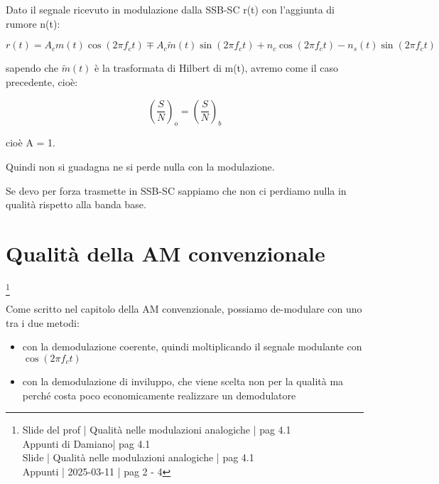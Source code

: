 Dato il segnale ricevuto in modulazione dalla SSB-SC r(t) con l'aggiunta di rumore n(t): 

{
    \Large 
    \begin{equation}
        r (t)
        =
        A_c m(t) \cos(2 \pi f_c t)
        \mp
        A_c \tilde{m} (t) \sin(2 \pi f_c t)
        +
        n_c \cos(2 \pi f_c t)
        - 
        n_s (t) \sin(2 \pi f_c t)
    \end{equation}
}

sapendo che $\tilde{m} (t)$ è la trasformata di Hilbert di m(t), 
avremo come il caso precedente, cioè: 

{
    \Large 
    \begin{equation}
        \left(
            \frac{S}{N}
        \right)_{o}
        = 
        \left(
            \frac{S}{N}
        \right)_{b}
    \end{equation}
}

cioè A = 1. \newline 

Quindi non si guadagna ne si perde nulla con la modulazione. \newline 

Se devo per forza trasmette in SSB-SC sappiamo che non ci perdiamo nulla in qualità rispetto alla banda base. \newline 

\newpage 

\section{Qualità della AM convenzionale}
\footnote{Slide del prof | Qualità nelle modulazioni analogiche | pag 4.1 \\  
Appunti di Damiano| pag 4.1 \\
Slide | Qualità nelle modulazioni analogiche | pag 4.1 \\
Appunti | 2025-03-11 | pag 2 - 4 
} 

Come scritto nel capitolo della AM convenzionale, 
possiamo de-modulare con uno tra i due metodi: 

\begin{itemize}
    \item con la demodulazione coerente, quindi moltiplicando il segnale modulante con $\cos(2 \pi f_c t)$
    \item con la demodulazione di inviluppo, che viene scelta non per la qualità ma perché costa poco economicamente realizzare un demodulatore
\end{itemize}

